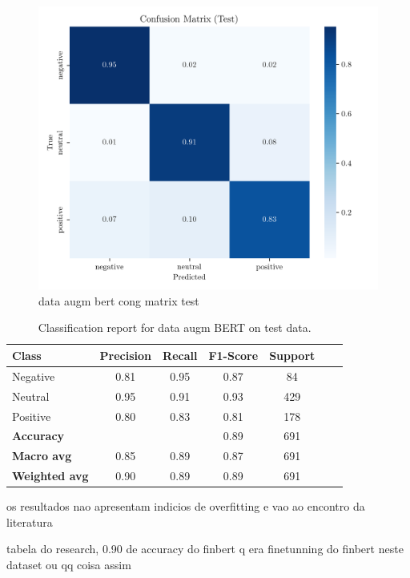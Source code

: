 \documentclass[conference]{IEEEtran}
\begin{document}
\begin{figure}[H]
    \centering
    \includegraphics[width=1\linewidth]{assets/dataaugmented_bert_confusion_matrix_Test.png}
    \caption{data augm bert cong matrix test}
    \label{fig:dataaugmented_bert_confusion_matrix_Test}
\end{figure}

\begin{table}[H]
\centering
\caption{Classification report for data augm BERT on test data.}
\label{cr_augmbert_test}
\begin{tabular}{lcccccc}
\toprule
\textbf{Class} & \textbf{Precision} & \textbf{Recall} & \textbf{F1-Score} & \textbf{Support} \\
\midrule
Negative & 0.81 & 0.95 & 0.87 & 84 \\
Neutral & 0.95 & 0.91 & 0.93 & 429 \\
Positive & 0.80 & 0.83 & 0.81 & 178 \\
\midrule
\textbf{Accuracy} &  &  & 0.89 & 691 \\
\textbf{Macro avg} & 0.85 & 0.89 & 0.87 & 691 \\
\textbf{Weighted avg} & 0.90 & 0.89 & 0.89 & 691 \\
\bottomrule
\end{tabular}
\end{table}

os resultados nao apresentam indicios de overfitting e vao ao encontro da literatura

tabela do research, 0.90 de accuracy do finbert q era finetunning do finbert neste dataset ou qq coisa assim
\end{document}
